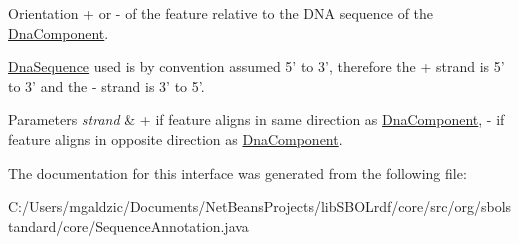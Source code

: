 Orientation + or -\/ of the feature relative to the DNA sequence of the \hyperlink{interfaceorg_1_1sbolstandard_1_1core_1_1_dna_component}{DnaComponent}. 

\hyperlink{interfaceorg_1_1sbolstandard_1_1core_1_1_dna_sequence}{DnaSequence} used is by convention assumed 5' to 3', therefore the {\ttfamily +} strand is 5' to 3' and the {\ttfamily -\/} strand is 3' to 5'.


\begin{DoxyParams}{Parameters}
{\em strand} & {\ttfamily +} if feature aligns in same direction as \hyperlink{interfaceorg_1_1sbolstandard_1_1core_1_1_dna_component}{DnaComponent}, {\ttfamily -\/} if feature aligns in opposite direction as \hyperlink{interfaceorg_1_1sbolstandard_1_1core_1_1_dna_component}{DnaComponent}. \\
\hline
\end{DoxyParams}


The documentation for this interface was generated from the following file:\begin{DoxyCompactItemize}
\item 
C:/Users/mgaldzic/Documents/NetBeansProjects/libSBOLrdf/core/src/org/sbolstandard/core/SequenceAnnotation.java\end{DoxyCompactItemize}
